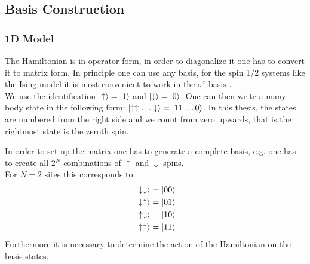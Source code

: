 \documentclass[a4paper,12pt]{article}
\begin{document}
\subsection{Basis Construction}
\subsubsection{1D Model}

The Hamiltonian is in operator form, in order to diagonalize it one
has to convert it to matrix form. In principle one can use any basis,
for the spin 1/2 systems like the Ising model it is most convenient to
work in the $\sigma^z$ basis \cite{Noack,Laflorencie}.\\
We use the identification $\ket{\uparrow} = \ket{1}$ and
$\ket{\downarrow} = \ket{0}$. One can then write a many-body state in
the following form: $\ket{\uparrow \uparrow \dotso \downarrow} =
\ket{11 \dotso 0}$. In this thesis, the states are numbered from the
right side and we count from zero upwards, that is the rightmost state
is the zeroth spin.

In order to set up the matrix one has to generate a complete basis, e.g. one has to create all 2$^{N}$ combinations of $\uparrow$ and $\downarrow$ spins.\\
For $N=2$ sites this corresponds to:
\begin{align*}
&\ket{\downarrow \downarrow} = \ket{00}\\
&\ket{\downarrow \uparrow} = \ket{01}\\
&\ket{\uparrow \downarrow} = \ket{10}\\
&\ket{\uparrow \uparrow} = \ket{11}\\
\end{align*}
Furthermore it is necessary to determine the action of the Hamiltonian
on the basis states.
\end{document}
